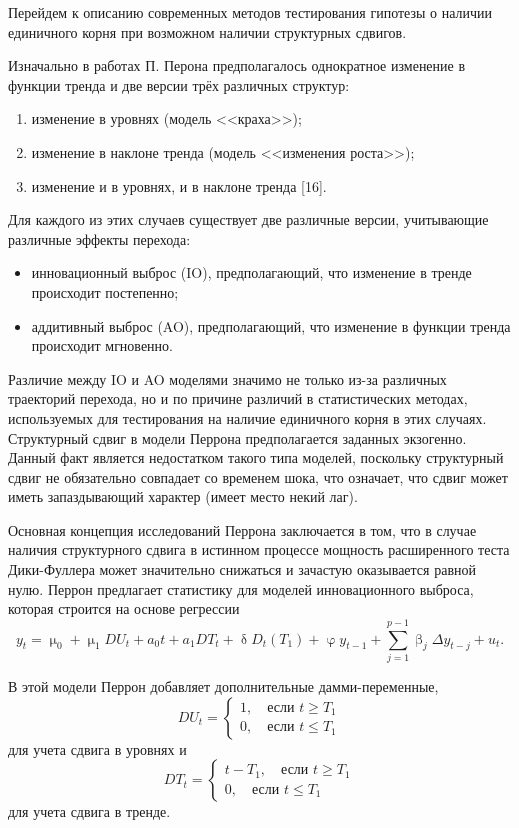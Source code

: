 \documentclass[a4paper, 14pt]{extreport}
\numberwithin{equation}{subsection}
\renewcommand{\leq}{\leqslant}
\renewcommand{\geq}{\geqslant}
\renewcommand{\beta}{\upbeta}
\renewcommand{\delta}{\updelta}
\renewcommand{\varphi}{\upvarphi}
\renewcommand{\mu}{\upmu}
\numberwithin{equation}{section}
\begin{document}
	Перейдем к описанию современных методов тестирования гипотезы о наличии единичного корня при возможном наличии структурных сдвигов.
	
	Изначально в работах П. Перона предполагалось однократное изменение в функции тренда и две версии трёх различных структур:
	\begin{enumerate}
		\item изменение в уровнях (модель <<краха>>);
		\item изменение в наклоне тренда (модель <<изменения роста>>);
		\item изменение и в уровнях, и в наклоне тренда  [16].
	\end{enumerate}
	
	Для каждого из этих случаев существует две различные версии, учитывающие различные эффекты перехода:
	\begin{itemize}
		\item инновационный выброс (IO), предполагающий, что изменение в тренде происходит постепенно;
		\item аддитивный выброс (AO), предполагающий, что изменение в функции тренда происходит мгновенно.
	\end{itemize}
	
	Различие между IO и AO моделями значимо не только из-за различных траекторий перехода, но и по причине различий в статистических методах, используемых для тестирования на наличие единичного корня в этих случаях. Структурный сдвиг в модели Перрона предполагается заданных экзогенно. Данный факт является недостатком такого типа моделей, поскольку структурный сдвиг не обязательно совпадает со временем шока, что означает, что сдвиг может иметь запаздывающий характер (имеет место некий лаг).
	
	Основная концепция исследований Перрона заключается в том, что в случае наличия структурного сдвига в истинном процессе мощность расширенного теста Дики-Фуллера может значительно снижаться и зачастую оказывается равной нулю. Перрон предлагает статистику для моделей инновационного выброса, которая строится на основе регрессии
	\begin{equation}
		y_t=\mu_0+\mu_1DU_t+a_0t+a_1DT_t+\delta D_t(T_1)+\varphi y_{t-1}+\sum\limits_{j=1}^{p-1}\beta_j\Delta y_{t-j}+u_t.
	\end{equation}
	
	В этой модели Перрон добавляет дополнительные дамми-переменные,
	$$DU_t=\begin{cases}1, \quad\text{если } t\geq T_1\\
		0,\quad\text{если } t\leq T_1\end{cases}$$
	для учета сдвига в уровнях и
	$$DT_t=\begin{cases}t-T_1, \quad\text{если } t\geq T_1\\
		0,\quad\text{если } t\leq T_1\end{cases}$$
	для учета сдвига в тренде.
	
\end{document}
